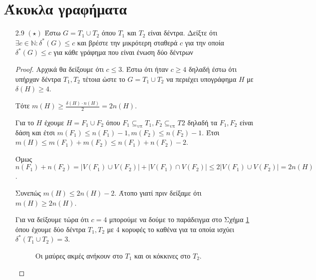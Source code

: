 \documentclass[a4paper, oneside, 11pt]{article}
\theoremstyle{definition}
\begin{document}
\section{Άκυκλα γραφήματα}

\begin{enumerate}
   \item[2.9 $(\star)$]
      Έστω $G = T_1 \cup T_2$ όπου $T_1$ και $T_2$ είναι δέντρα. Δείξτε
      ότι $\exists c \in \mathbb{N} : \delta^*(G) \leq c$ και βρέστε
      την μικρότερη σταθερά $c$ για την οποία $\delta^*(G) \leq c$ για κάθε
      γράφημα που είναι ένωση δύο δέντρων

      \begin{proof}
         Αρχικά θα δείξουμε ότι $c \leq 3$. Έστω ότι ήταν $c \geq 4$
         δηλαδή έστω ότι υπήρχαν δέντρα $T_1, T_2$ τέτοια ώστε
         το $G = T_1 \cup T_2$ να περιέχει υπογράφημα $H$ με
         $\delta(H) \geq 4$.

         Τότε $m(H) \geq \frac{\delta(H) \cdot n(H)}{2} = 2n(H)$.

         Για το $H$ έχουμε $H = F_1 \cup F_2$ όπου $F_1 \subseteq_{\text{υπ}}
         T_1, F_2 \subseteq_{\text{υπ}} T2$ δηλαδή τα $F_1, F_2$ είναι δάση
         και έτσι $m(F_1) \leq n(F_1) -1, m(F_2) \leq n(F_2) - 1$.
         Έτσι $m(H) \leq m(F_1) + m(F_2) \leq n(F_1) + n(F_2) - 2$.

         Όμως $n(F_1) + n(F_2) = |V(F_1) \cup V(F_2)| + |V(F_1) \cap V(F_2)|
         \leq 2|V(F_1) \cup V(F_2)| = 2n(H)$.

         Συνεπώς $m(H) \leq 2n(H) -2$. Άτοπο γιατί πριν δείξαμε ότι
         $m(H) \geq 2n(H)$.

         Για να δείξουμε τώρα ότι $c = 4$ μπορούμε να δούμε το παράδειγμα
         στο Σχήμα \ref{fig2.10.1} όπου έχουμε δύο δέντρα $T_1, T_2$ με 4 κορυφές
         το καθένα για τα οποία ισχύει $\delta^*(T_1 \cup T_2) = 3$.

         \begin{figure}
         \begin{center}
         \caption{Οι μαύρες ακμές ανήκουν στο $T_1$ και οι κόκκινες στο
                  $T_2$.}
         \label{fig2.10.1}
         \end{center}
         \end{figure}
      \end{proof}


\end{enumerate}
\end{document}
